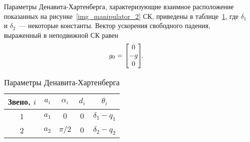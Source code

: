 Параметры Денавита-Хартенберга, характеризующие взаимное расположение показанных на рисунке~\ref{img_manipulator_2} СК, приведены в таблице~\ref{table_DH_params_for_2}, где $\delta_1$ и $\delta_2$~--- некоторые константы.
Вектор ускорения свободного падения, выраженный в неподвижной СК равен
\begin{equation}
    g_0 =
    \begin{bmatrix}
        0 \\ -g \\ 0
    \end{bmatrix}\!\!\ldotp
\end{equation}

\begin{table}[h!]
    \caption{Параметры Денавита-Хартенберга}
    \begin{center}
        \begin{tabular}{|c|c|c|c|c|}
        \hline
        Звено, $i$ & $a_i$ & $\alpha_i$ & $d_i$ & $\theta_i$ \\
        \hline
        1 & $a_1$ & $0$ & $0$ & $\delta_1 - q_1$ \\
        \hline
        2 & $a_2$ & $\pi / 2$ & $0$ & $\delta_2 - q_2$ \\
        \hline
        \end{tabular}
    \end{center}
    \label{table_DH_params_for_2}
\end{table}

